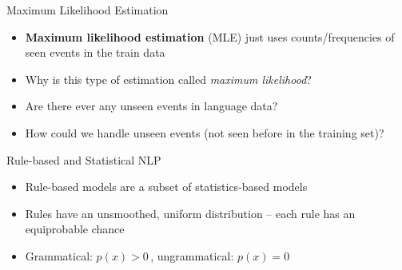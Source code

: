 \documentclass{beamer}
\begin{document}

\begin{frame}{Maximum Likelihood Estimation}
\begin{itemize}
	\item \textbf{Maximum likelihood estimation} (MLE) just uses counts/frequencies of seen events in the train data
	\item Why is this type of estimation called \textit{maximum likelihood}?
	\pause
	\item Are there ever any unseen events in language data?
	\pause
	\item How could we handle unseen events (not seen before in the training set)?
\end{itemize}
\end{frame}


\begin{frame}{Rule-based and Statistical NLP}
\begin{itemize}
	\item Rule-based models are a subset of statistics-based models
	\pause
	\item Rules have an unsmoothed, uniform distribution -- each rule has an equiprobable chance
	\pause
	\item Grammatical: $p(x) > 0$\,, ungrammatical: $p(x) = 0$
\end{itemize}
\end{frame}

\end{document}
